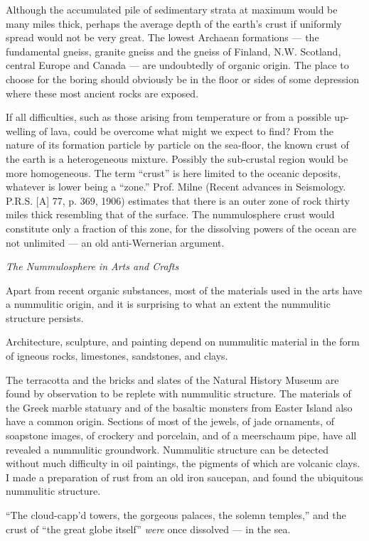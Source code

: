 \documentclass[a4paper, 12pt, oneside]{article}
\begin{document}
Although the accumulated pile of sedimentary strata at maximum would be many miles thick, perhaps the average depth of the earth's crust if uniformly spread would not be very great. The lowest Archaean formations --- the fundamental gneiss, granite gneiss and the gneiss of Finland, N.W. Scotland, central Europe and Canada --- are undoubtedly of organic origin. The place to choose for the boring should obviously be in the floor or sides of some depression where these most ancient rocks are exposed.

If all difficulties, such as those arising from temperature or from a possible up-welling of lava, could be overcome what might we expect to find? From the nature of its formation particle by particle on the sea-floor, the known crust of the earth is a heterogeneous mixture. Possibly the sub-crustal region would be more homogeneous. The term ``crust'' is here limited to the oceanic deposits, whatever is lower being a ``zone.'' Prof. Milne (Recent advances in Seismology. P.R.S. [A] 77, p. 369, 1906) estimates that there is an outer zone of rock thirty miles thick resembling that of the surface. The nummulosphere crust would constitute only a fraction of this zone, for the dissolving powers of the ocean are not unlimited --- an old anti-Wernerian argument.

\centerline{\emph{The Nummulosphere in Arts and Crafts}}

Apart from recent organic substances, most of the materials used in the arts have a nummulitic origin, and it is surprising to what an extent the nummulitic structure persists.

Architecture, sculpture, and painting depend on nummulitic material in the form of igneous rocks, limestones, sandstones, and clays.

The terracotta and the bricks and slates of the Natural History Museum are found by observation to be replete with nummulitic structure. The materials of the Greek marble statuary and of the basaltic monsters from Easter Island also have a common origin. Sections of most of the jewels, of jade ornaments, of soapstone images, of crockery and porcelain, and of a meerschaum pipe, have all revealed a nummulitic groundwork. Nummulitic structure can be detected without much difficulty in oil paintings, the pigments of which are volcanic clays. I made a preparation of rust from an old iron saucepan, and found the ubiquitous nummulitic structure.

``The cloud-capp'd towers, the gorgeous palaces, the solemn temples,'' and the crust of ``the great globe itself'' \emph{were} once dissolved --- in the sea.
\clearpage
\end{document}

